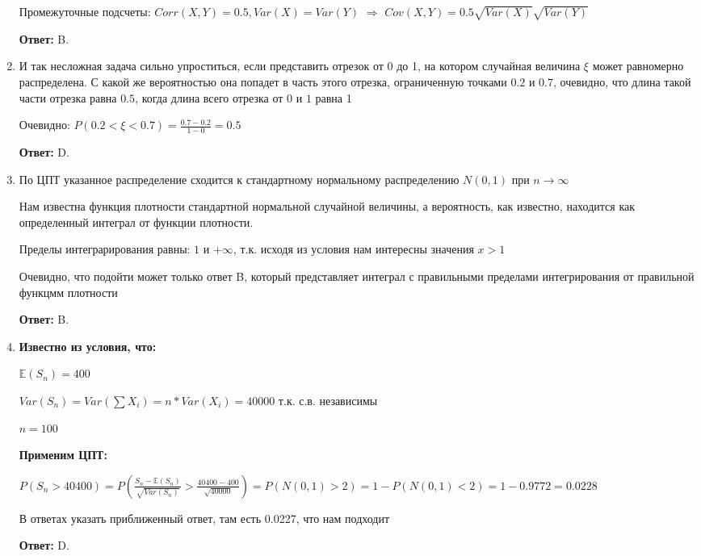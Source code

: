 \documentclass[a4paper]{article} %
\begin{document}
\begin{enumerate}
    
    Промежуточные подсчеты: $Corr(X,Y) = 0.5, Var(X) = Var(Y)$ $\Rightarrow$ $Cov(X,Y) = 0.5\sqrt{Var(X)}\sqrt{Var(Y)}$ 
    
    \textbf{Ответ:} B.
    
    
    
    \item
    И так несложная задача сильно упроститься, если представить отрезок от 0 до 1, на котором случайная величина $\xi$ может равномерно распределена. С какой же вероятностью она попадет в часть этого отрезка, ограниченную точками $0.2$ и $0.7$, очевидно, что длина такой части отрезка равна $0.5$, когда длина всего отрезка от $0$ и $1$ равна 1
    
    Очевидно: $P(0.2 < \xi < 0.7) = \frac{0.7 - 0.2}{1 - 0} = 0.5 $
    
    \textbf{Ответ:} D.
    
    \item
    По ЦПТ указанное распределение сходится к стандартному нормальному распределению $N(0,1)$ при $n \rightarrow \infty$
    
    Нам известна функция плотности стандартной нормальной случайной величины, а вероятность, как известно, находится как определенный интеграл от функции плотности. 
    
    Пределы интеграрирования равны: $1$ и ${+\infty}$, т.к. исходя из условия нам интересны значения $x >1$
    
    Очевидно, что подойти может только ответ B, который представляет интеграл с правильными пределами интегрирования от правильной функцмм плотности
    
    \textbf{Ответ:} B.
    
    
    
    
    \item
    \textbf{Известно из условия, что:}
    
    $\mathbb{E}(S_n) = 400$
    
    $Var(S_n) = Var(\sum X_i) = n * Var(X_i) = 40000$ т.к. с.в. независимы
    
    $n = 100$
    
    \textbf{Применим ЦПТ:}
    
    $P(S_n > 40400) = P(\frac{S_n - \mathbb{E}(S_n)}{\sqrt{Var(S_n)}} > \frac{40400 - 400}{\sqrt{40000}}) = P(N(0,1) > 2) = 1 - P(N(0,1) < 2) = 1 - 0.9772 = 0.0228$
    
    В ответах указать приближенный ответ, там есть 0.0227, что нам подходит
    
    \textbf{Ответ:} D.
    

\end{enumerate}
\end{document}
